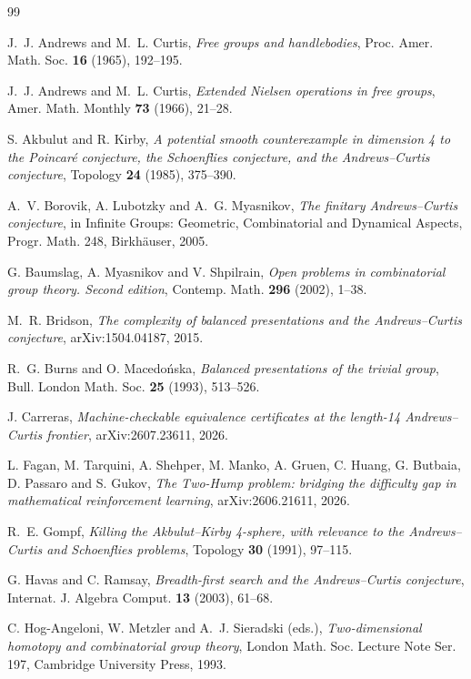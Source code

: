 \documentclass[11pt,a4paper]{article}
\theoremstyle{definition}
\begin{document}
\normalsize

\begin{thebibliography}{99}

 J.~J. Andrews and M.~L. Curtis, \emph{Free groups and handlebodies}, Proc. Amer. Math. Soc. \textbf{16} (1965), 192--195.

 J.~J. Andrews and M.~L. Curtis, \emph{Extended Nielsen operations in free groups}, Amer. Math. Monthly \textbf{73} (1966), 21--28.

 S. Akbulut and R. Kirby, \emph{A potential smooth counterexample in dimension 4 to the Poincar\'e conjecture, the Schoenflies conjecture, and the Andrews--Curtis conjecture}, Topology \textbf{24} (1985), 375--390.

 A.~V. Borovik, A. Lubotzky and A.~G. Myasnikov, \emph{The finitary Andrews--Curtis conjecture}, in Infinite Groups: Geometric, Combinatorial and Dynamical Aspects, Progr. Math. 248, Birkh\"auser, 2005.

 G. Baumslag, A. Myasnikov and V. Shpilrain, \emph{Open problems in combinatorial group theory. Second edition}, Contemp. Math. \textbf{296} (2002), 1--38.

 M.~R. Bridson, \emph{The complexity of balanced presentations and the Andrews--Curtis conjecture}, arXiv:1504.04187, 2015.

 R.~G. Burns and O. Macedo\'nska, \emph{Balanced presentations of the trivial group}, Bull. London Math. Soc. \textbf{25} (1993), 513--526.

 J. Carreras, \emph{Machine-checkable equivalence certificates at the length-14 Andrews--Curtis frontier}, arXiv:2607.23611, 2026.

 L. Fagan, M. Tarquini, A. Shehper, M. Manko, A. Gruen, C. Huang, G. Butbaia, D. Passaro and S. Gukov, \emph{The Two-Hump problem: bridging the difficulty gap in mathematical reinforcement learning}, arXiv:2606.21611, 2026.

 R.~E. Gompf, \emph{Killing the Akbulut--Kirby 4-sphere, with relevance to the Andrews--Curtis and Schoenflies problems}, Topology \textbf{30} (1991), 97--115.

 G. Havas and C. Ramsay, \emph{Breadth-first search and the Andrews--Curtis conjecture}, Internat. J. Algebra Comput. \textbf{13} (2003), 61--68.

 C. Hog-Angeloni, W. Metzler and A.~J. Sieradski (eds.), \emph{Two-dimensional homotopy and combinatorial group theory}, London Math. Soc. Lecture Note Ser. 197, Cambridge University Press, 1993.


\end{thebibliography}
\end{document}
